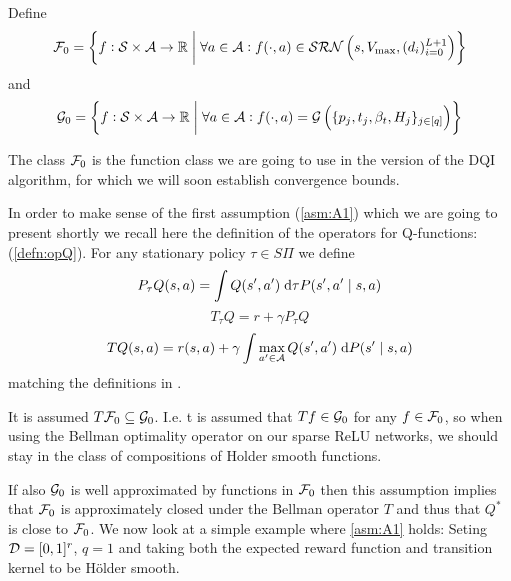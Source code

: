 \begin{defn}\label{defn:F0G0}
  Define
  \[ \mathcal{F}_0 = \left\{ f : \mathcal{S} \times \mathcal{A} \to \mathbb{R} \;\middle\vert\;
  \forall a \in \mathcal{A} : f(\cdot, a) \in \mathcal{SRN}\left( s, V_{\max},
  (d_i)_{i=0}^{L+1} \right) \right\} \]
  and
  \[ \mathcal{G}_0 = \left\{ f : \mathcal{S} \times \mathcal{A} \to \mathbb{R}
      \;\middle\vert\; \forall a \in \mathcal{A} :
      f(\cdot, a) = \mathcal{G}\left(\{p_j, t_j, \beta_t, H_j\}_{j \in [q]} \right)
  \right\} \]
\end{defn}

The class $\mathcal{F}_0$ is the function class we are going to use in the version
of the DQI algorithm, for which we will soon establish convergence bounds.

In order to make sense of the first assumption (\cref{asm:A1}) which we
are going to present shortly
we recall here the definition of the operators for Q-functions:
(\cref{defn:opQ}). For any stationary policy $\tau \in S\Pi$ we define
\[ P_\tau Q(s, a) = \int Q(s', a') \; \mathrm{d} \tau P(s', a' \mid s, a) \]
\[ T_\tau Q = r + \gamma P_\tau Q \]
\[ T Q(s, a) = r(s, a) + \gamma
\int \max_{a' \in \mathcal{A}} Q(s', a') \; \mathrm{d} P(s' \mid s, a) \]
matching the definitions in .

\begin{asm}
  It is assumed $ T \mathcal{F}_0 \subseteq \mathcal{G}_0$.
  I.e. t is assumed that $T f \in \mathcal{G}_0$ for any $f \in \mathcal{F}_0$, 
  so when using the Bellman optimality operator on our sparse ReLU networks,
  we should stay in the class of compositions of Holder smooth functions.
  \label{asm:A1}
\end{asm}

If also $\mathcal{G}_0$ is well approximated by functions in $\mathcal{F}_0$
then this assumption implies that $\mathcal{F}_0$ is approximately closed
under the Bellman operator $T$ and thus that $Q^*$ is close to $\mathcal{F}_0$.
We now look at a simple example where \cref{asm:A1} holds:
Seting $\mathcal{D}=[0,1]^r$, $q=1$ 
and taking both the expected reward function and transition kernel
to be Hölder smooth.

